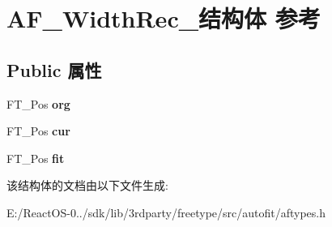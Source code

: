 \hypertarget{struct_a_f___width_rec__}{}\section{A\+F\+\_\+\+Width\+Rec\+\_\+结构体 参考}
\label{struct_a_f___width_rec__}
\subsection*{Public 属性}
\begin{DoxyCompactItemize}
\item 
\mbox{\label{struct_a_f___width_rec___a60bed8128a114e3c6d468a6cf826221f}} 
F\+T\+\_\+\+Pos {\bfseries org}
\item 
\mbox{\label{struct_a_f___width_rec___a07d632f5b3c38eace8193872d752e1d1}} 
F\+T\+\_\+\+Pos {\bfseries cur}
\item 
\mbox{\label{struct_a_f___width_rec___a3f6b53859bb839057ae22345627969f7}} 
F\+T\+\_\+\+Pos {\bfseries fit}
\end{DoxyCompactItemize}


该结构体的文档由以下文件生成\+:\begin{DoxyCompactItemize}
\item 
E\+:/\+React\+O\+S-\/0../sdk/lib/3rdparty/freetype/src/autofit/aftypes.\+h\end{DoxyCompactItemize}
